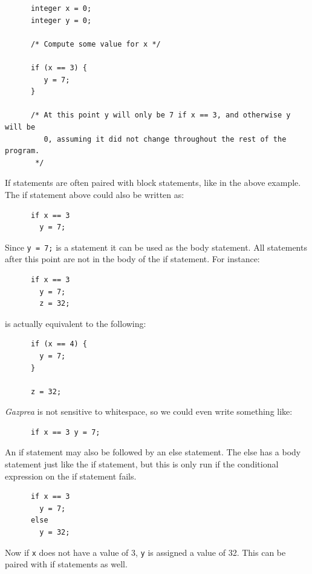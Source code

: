 \documentclass{article}
\begin{document}
    \begin{lstlisting}
      integer x = 0;
      integer y = 0;

      /* Compute some value for x */

      if (x == 3) {
         y = 7;
      }

      /* At this point y will only be 7 if x == 3, and otherwise y will be
         0, assuming it did not change throughout the rest of the program.
       */
    \end{lstlisting}

    If statements are often paired with block statements, like in the above example. The if statement above could
    also be written as:

    \begin{lstlisting}
      if x == 3
        y = 7;
    \end{lstlisting}

    Since \texttt{y = 7;} is a statement it can be used as the body statement. All statements after this point are
    not in the body of the if statement. For instance:

    \begin{lstlisting}
      if x == 3
        y = 7;
        z = 32;
    \end{lstlisting}

    is actually equivalent to the following:

    \begin{lstlisting}
      if (x == 4) {
        y = 7;
      }

      z = 32;
    \end{lstlisting}

    \textit{Gazprea} is not sensitive to whitespace, so we could even write something like:

    \begin{lstlisting}
      if x == 3 y = 7;
    \end{lstlisting}

    An if statement may also be followed by an else statement. The else has a body statement just like the if
    statement, but this is only run if the conditional expression on the if statement fails.

    \begin{lstlisting}
      if x == 3
        y = 7;
      else
        y = 32;
    \end{lstlisting}

    Now if \texttt{x} does not have a value of 3, \texttt{y} is assigned a value of 32. This can be paired with if
    statements as well.
\end{document}
